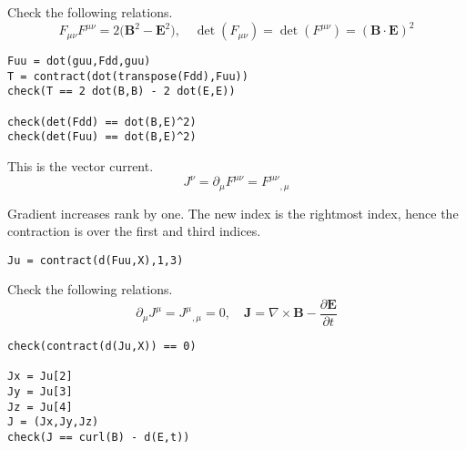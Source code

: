 Check the following relations.
\begin{equation*}
F_{\mu\nu}F^{\mu\nu}=2\bigl(\mathbf B^2-\mathbf E^2\bigl),\quad
\det(F_{\mu\nu})=\det(F^{\mu\nu})=(\mathbf B\cdot\mathbf E)^2
\end{equation*}
{\footnotesize
\begin{verbatim}
Fuu = dot(guu,Fdd,guu)
T = contract(dot(transpose(Fdd),Fuu))
check(T == 2 dot(B,B) - 2 dot(E,E))

check(det(Fdd) == dot(B,E)^2)
check(det(Fuu) == dot(B,E)^2)
\end{verbatim}}

This is the vector current.
\begin{equation*}
J^\nu
=\partial_\mu F^{\mu\nu}
=F^{\mu\nu}{}_{,\mu}
\end{equation*}

Gradient increases rank by one.
The new index is the rightmost index,
hence the contraction is over the first and third indices.
{\footnotesize
\begin{verbatim}
Ju = contract(d(Fuu,X),1,3)
\end{verbatim}}

Check the following relations.
\begin{equation*}
\partial_\mu J^\mu=J^\mu{}_{,\mu}=0,
\quad\mathbf J=\nabla\times\mathbf B-\frac{\partial\mathbf E}{\partial t}
\end{equation*}
{\footnotesize
\begin{verbatim}
check(contract(d(Ju,X)) == 0)

Jx = Ju[2]
Jy = Ju[3]
Jz = Ju[4]
J = (Jx,Jy,Jz)
check(J == curl(B) - d(E,t))
\end{verbatim}}


